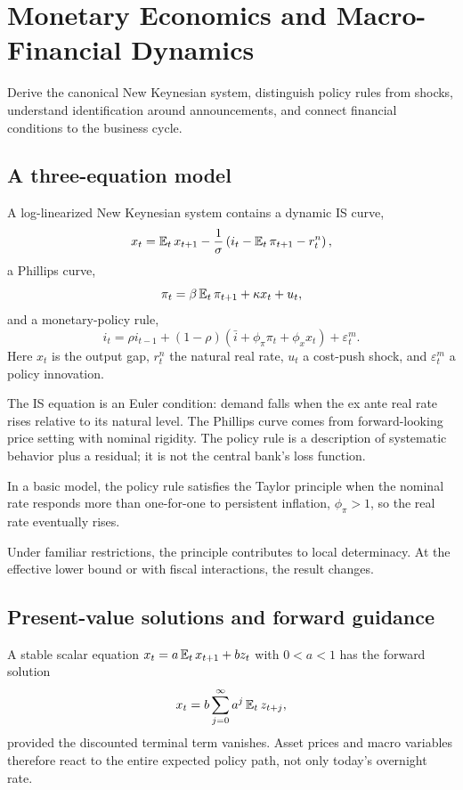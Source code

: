 \chapter{Monetary Economics and Macro-Financial Dynamics}

\begin{objectives}
Derive the canonical New Keynesian system, distinguish policy rules from shocks,
understand identification around announcements, and connect financial conditions to
the business cycle.
\end{objectives}

\section{A three-equation model}

A log-linearized New Keynesian system contains a dynamic IS curve,
\[
x_t=\operatorname{\mathbb E}_tx_{t+1}
-\frac{1}{\sigma}\left(i_t-\operatorname{\mathbb E}_t\pi_{t+1}-r_t^n\right),
\]
a Phillips curve,
\[
\pi_t=\beta\operatorname{\mathbb E}_t\pi_{t+1}+\kappa x_t+u_t,
\]
and a monetary-policy rule,
\[
i_t=\rho i_{t-1}+(1-\rho)
(\bar i+\phi_\pi\pi_t+\phi_xx_t)+\varepsilon_t^m.
\]
Here $x_t$ is the output gap, $r_t^n$ the natural real rate, $u_t$ a cost-push shock,
and $\varepsilon_t^m$ a policy innovation.

The IS equation is an Euler condition: demand falls when the ex ante real rate rises
relative to its natural level. The Phillips curve comes from forward-looking price
setting with nominal rigidity. The policy rule is a description of systematic
behavior plus a residual; it is not the central bank's loss function.

\begin{definition}
In a basic model, the policy rule satisfies the Taylor principle when the nominal
rate responds more than one-for-one to persistent inflation, $\phi_\pi>1$, so the
real rate eventually rises.
\end{definition}

Under familiar restrictions, the principle contributes to local determinacy.
At the effective lower bound or with fiscal interactions, the result changes.

\section{Present-value solutions and forward guidance}

A stable scalar equation $x_t=a\operatorname{\mathbb E}_tx_{t+1}+b z_t$ with $0<a<1$ has the forward
solution
\[
x_t=b\sum_{j=0}^\infty a^j\operatorname{\mathbb E}_tz_{t+j},
\]
provided the discounted terminal term vanishes. Asset prices and macro variables
therefore react to the entire expected policy path, not only today's overnight rate.

